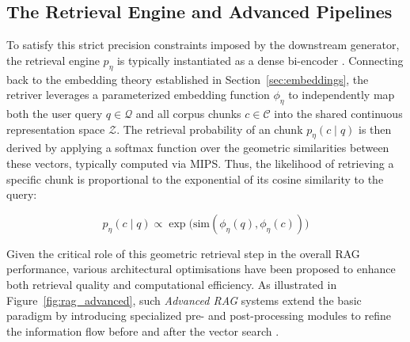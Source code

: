 \subsection{The Retrieval Engine and Advanced Pipelines}
\label{sec:rag_pipeline}

To satisfy this strict precision constraints imposed by the downstream generator, the retrieval engine $p_\eta$ is typically instantiated as a dense bi-encoder \cite{Karpukhin2020_DPR}. Connecting back to the embedding theory established in Section~\ref{sec:embeddings}, the retriver leverages a parameterized embedding function $\phi_\eta$ to independently map both the user query $q \in \mathcal{Q}$ and all corpus chunks $c \in \mathcal{C}$ into the shared continuous representation space $\mathcal{Z}$. The retrieval probability of an chunk $p_\eta(c \mid q)$ is then derived by applying a softmax function over the geometric similarities between these vectors, typically computed via \ac{MIPS}. Thus, the likelihood of retrieving a specific chunk is proportional to the exponential of its cosine similarity to the query:

\begin{equation}
    p_\eta(c \mid q) \propto \exp\bigl(\text{sim}(\phi_\eta(q), \phi_\eta(c))\bigr)
\end{equation}

Given the critical role of this geometric retrieval step in the overall \ac{RAG} performance, various architectural optimisations have been proposed to enhance both retrieval quality and computational efficiency. As illustrated in Figure~\ref{fig:rag_advanced}, such \emph{Advanced \ac{RAG}} systems extend the basic paradigm by introducing specialized pre- and post-processing modules to refine the information flow before and after the vector search \cite{barnett2024seven, gao_2024_rag}. 


